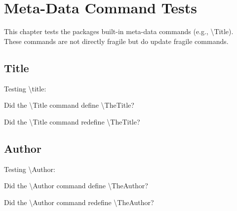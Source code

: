 \chapter{Meta-Data Command Tests}

This chapter tests the packages built-in meta-data commands (e.g., \backslash{}Title).
These commands are not directly fragile but do update fragile commands.

\section{Title}

Testing \backslash{title}:

\hfill
\let\PageWidth\linewidth
\addtolength{\PageWidth}{-0.95em}
\begin{minipage}{\PageWidth}
    
    
    
    Did the \backslash{}Title command define \backslash{}TheTitle? \TheTitle
    
    \show\MetaDataList
    
    Did the \backslash{}Title command redefine \backslash{}TheTitle? \TheTitle
    
    \MetaDataList
    
\end{minipage}



\section{Author}

Testing \backslash{Author}:

\hspace{1em}
\let\PageWidth\linewidth
\addtolength{\PageWidth}{-0.95em}
\begin{minipage}{\PageWidth}
    
    
    
    Did the \backslash{}Author command define \backslash{}TheAuthor? \TheAuthor
    
    \show\MetaDataList
    
    Did the \backslash{}Author command redefine \backslash{}TheAuthor? \TheAuthor
    
    \MetaDataList
    
\end{minipage}

    \MetaDataList
